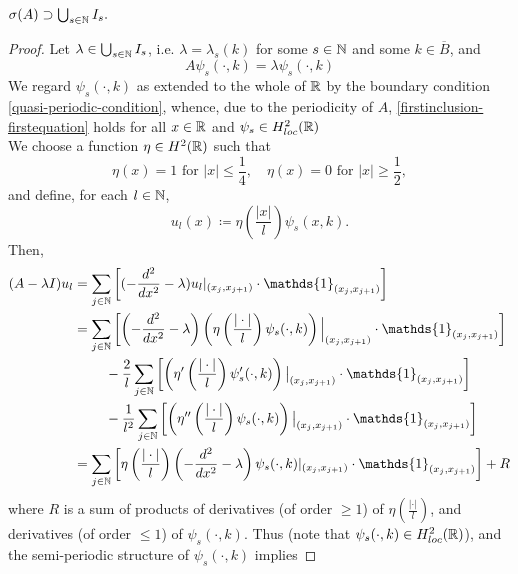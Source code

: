 \begin{theorem}
	$\sigma(A) \supset \bigcup_{s \in \mathbb{N}} I_{s}.$
	\begin{proof}
		Let $\lambda \in \bigcup_{s \in \mathbb{N}} I_{s}$, i.e. $\lambda = \lambda_{s}(k)$ for some $s \in \mathbb{N}$ and some $k \in \overline{B}$, and 
		\begin{equation}
			A \psi_{s}(\cdot, k) = \lambda \psi_{s}(\cdot, k) \label{firstinclusion-firstequation}
		\end{equation}
		We regard $\psi_{s}(\cdot, k)$ as extended to the whole of $\mathbb{R}$ by the boundary condition \eqref{quasi-periodic-condition}, whence, due to the periodicity of $A$, \eqref{firstinclusion-firstequation} holds for all $x \in \mathbb{R}$ and $\psi_{s} \in H^{2}_{loc}(\mathbb{R})$ \\
		We choose a function $\eta \in H^{2}(\mathbb{R})$ such that
			\[ \eta(x) = 1 \text{ for } |x| \leq \frac{1}{4}, \quad \eta(x) = 0 \text{ for } |x| \geq \frac{1}{2}, \]
		and define, for each $l \in \mathbb{N}$,
			\[ u_{l}(x) \coloneqq \eta\left(\frac{|x|}{l}\right) \psi_{s}(x, k). \]
	 	Then,
		\begin{align}
			(A - \lambda I) u_{l} & = \sum_{j \in \N} \left[ (- \frac{d^{2}}{dx^{2}} - \lambda) u_{l}|_{(x_{j}, x_{j+1})} \cdot \mathds{1}_{(x_{j}, x_{j+1})} \right] \label{eq:sepofspectraleq} \\
				& = \sum_{j \in \N} \left[ \left(- \frac{d^{2}}{dx^{2}} - \lambda \right) \left( \eta\left(\frac{|\cdot|}{l}\right) \psi_{s}(\cdot, k) \right)\Big|_{(x_{j}, x_{j+1})} \cdot \mathds{1}_{(x_{j}, x_{j+1})} \right] \notag \\
				& ~\qquad - \frac{2}{l} \sum_{j \in \N} \left[ \left( \eta'\left(\frac{|\cdot|}{l}\right) \psi_{s}'(\cdot, k) \right)\big|_{(x_{j}, x_{j+1})} \cdot \mathds{1}_{(x_{j}, x_{j+1})}  \right] \notag \\
				& ~\qquad - \frac{1}{l^{2}} \sum_{j \in \N} \left[ \left( \eta''\left(\frac{|\cdot|}{l}\right) \psi_{s}(\cdot, k) \right)\big|_{(x_{j}, x_{j+1})} \cdot \mathds{1}_{(x_{j}, x_{j+1})} \right] \notag \\
				& = \sum_{j \in \N} \left[ \eta\left(\frac{|\cdot|}{l}\right) \left(- \frac{d^{2}}{dx^{2}} - \lambda \right) \psi_{s}(\cdot, k) |_{(x_{j}, x_{j+1})} \cdot \mathds{1}_{(x_{j}, x_{j+1})} \right] + R \notag
		\end{align}
		where $R$ is a sum of products of derivatives (of order $\geq 1$) of $\eta(\frac{|\cdot|}{l})$, and derivatives (of order $\leq 1$) of $\psi_{s}(\cdot, k)$. Thus (note that $\psi_{s}(\cdot, k) \in H^{2}_{loc}(\mathbb{R})$), and the semi-periodic structure of $\psi_{s}(\cdot, k)$ implies

\end{proof}
\end{theorem}
